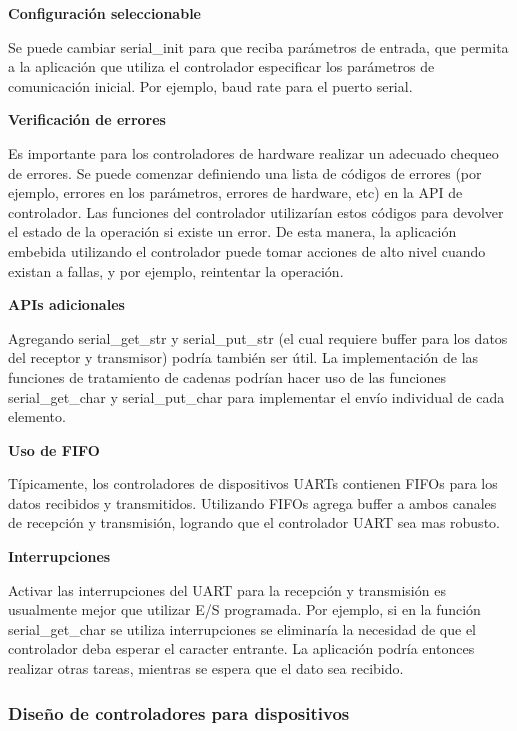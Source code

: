 \documentclass[12pt]{article}
\begin{document}

{\bf Configuración seleccionable}

Se puede cambiar serial\_init para que reciba parámetros de entrada,
que permita a la aplicación que utiliza el controlador especificar
los parámetros de comunicación inicial. Por ejemplo, baud rate para
el puerto serial.

{\bf Verificación de errores}

Es importante para los controladores de hardware realizar un adecuado
chequeo de errores. Se puede comenzar definiendo una lista de códigos
de errores (por ejemplo, errores en los parámetros, errores de hardware, etc)
en la API de controlador.
Las funciones del controlador utilizarían estos códigos para devolver
el estado de la operación si existe un error. De esta manera, la aplicación embebida
utilizando el controlador puede tomar acciones de alto nivel cuando existan
a fallas, y por ejemplo, reintentar la operación.

{\bf APIs adicionales}

Agregando serial\_get\_str y serial\_put\_str (el cual requiere buffer para
los datos del receptor y transmisor) podría también ser útil. La implementación
de las funciones de tratamiento de cadenas podrían hacer uso de las funciones
serial\_get\_char y serial\_put\_char para implementar el envío individual
de cada elemento.

{\bf Uso de FIFO}

Típicamente, los controladores de dispositivos UARTs contienen FIFOs para los datos recibidos y transmitidos.
Utilizando FIFOs agrega buffer a ambos canales de recepción y transmisión,
logrando que el controlador UART  sea mas robusto.

{\bf Interrupciones}

Activar las interrupciones del UART para la recepción y transmisión es
usualmente mejor que utilizar E/S programada. Por ejemplo, si en la función
serial\_get\_char se utiliza interrupciones se eliminaría la necesidad
de que el controlador deba esperar el caracter entrante. 
La aplicación podría entonces realizar
otras tareas, mientras se espera que el dato sea recibido. 

\subsubsection *{Diseño de controladores para dispositivos}
\end{document}
